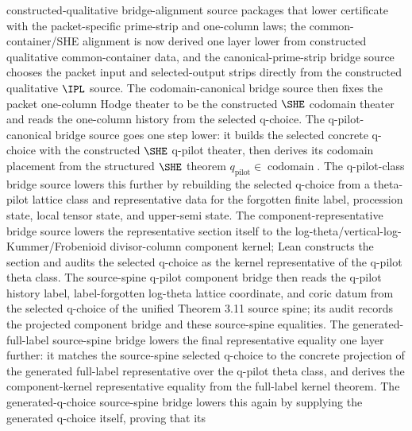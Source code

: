 \begin{definition}
  constructed-qualitative bridge-alignment source packages that lower
  certificate with the packet-specific prime-strip and one-column laws; the
  common-container/SHE alignment is now derived one layer lower from constructed
  qualitative common-container data, and the canonical-prime-strip bridge source
  chooses the packet input and selected-output strips directly from the
  constructed qualitative \(\IPL\) source.  The codomain-canonical bridge source
  then fixes the packet one-column Hodge theater to be the constructed
  \(\SHE\) codomain theater and reads the one-column history from the selected
  q-choice.  The q-pilot-canonical bridge source goes one step lower: it builds
  the selected concrete q-choice with the constructed \(\SHE\) q-pilot theater,
  then derives its codomain placement from the structured \(\SHE\) theorem
  \(q_{\mathrm{pilot}}\in\operatorname{codomain}\).  The q-pilot-class bridge
  source lowers this further by rebuilding the selected q-choice from a
  theta-pilot lattice class and representative data for the forgotten finite
  label, procession state, local tensor state, and upper-semi state.  The
  component-representative bridge source lowers the representative section
  itself to the log-theta/vertical-log-Kummer/Frobenioid divisor-column
  component kernel; Lean constructs the section and audits the selected
  q-choice as the kernel representative of the q-pilot theta class.  The
  source-spine q-pilot component bridge
  then reads the q-pilot history label, label-forgotten log-theta lattice
  coordinate, and coric datum from the selected q-choice of the unified
  Theorem 3.11 source spine; its audit
  records the projected component bridge and these source-spine equalities.
  The generated-full-label source-spine bridge
  lowers the final representative equality one layer further: it matches the
  source-spine selected q-choice to the concrete projection of the generated
  full-label representative over the q-pilot theta class, and derives the
  component-kernel representative equality from the full-label kernel theorem.
  The generated-q-choice source-spine bridge
  lowers this again by supplying the generated q-choice itself, proving that its

\end{definition}
